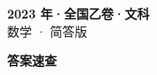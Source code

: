 \documentclass[zihao=-4, a4paper]{ctexart}
\begin{document}
\begin{center}
  {\Large\bfseries 2023 年·全国乙卷·文科}\\[4pt]
  {\large 数学 · 简答版}
\end{center}
\medskip
{}

\clearpage
{}
\begin{center}{\Large\bfseries 答案速查}\end{center}
\medskip

\end{document}
